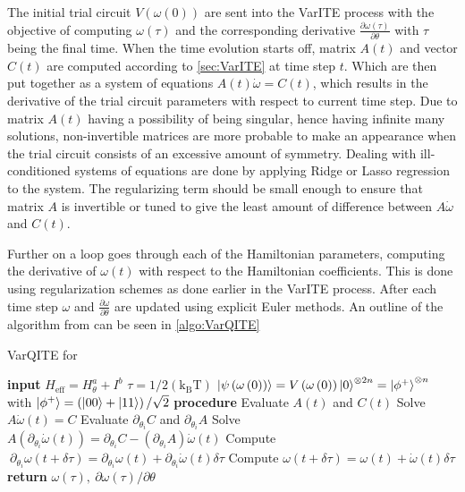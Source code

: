 \documentclass[../main.tex]{subfiles}
\begin{document}
The initial trial circuit $V(\omega(0))$ are sent into the VarITE process with the objective of computing $\omega(\tau)$ and the corresponding derivative $\frac{\partial \omega(\tau)}{\partial \theta}$ with $\tau$ being the final time. When the time evolution starts off, matrix $A(t)$ and vector $C(t)$ are computed according to \autoref{sec:VarITE} at time step $t$. Which are then put together as a system of equations $A(t)\dot{\omega}=C(t)$, which results in the derivative of the trial circuit parameters with respect to current time step. Due to matrix $A(t)$ having a possibility of being singular, hence having infinite many solutions, non-invertible matrices are more probable to make an appearance when the trial circuit consists of an excessive amount of symmetry. Dealing with ill-conditioned systems of equations are done by applying Ridge or Lasso regression to the system. The regularizing term should be small enough to ensure that matrix $A$ is invertible or tuned to give the least amount of difference between $A\dot{\omega}$ and $C(t)$.

Further on a loop goes through each of the Hamiltonian parameters, computing the derivative of $\omega(t)$ with respect to the Hamiltonian coefficients. This is done using regularization schemes as done earlier in the VarITE process. After each time step $\omega$ and $\frac{\partial\omega}{\partial \theta}$ are updated using explicit Euler methods. An outline of the algorithm from \cite{VQB:litteraturelist} can be seen in \autoref{algo:VarQITE}

\begin{algorithm}[ht]
 \caption{VarQITE for \varqbm} \label{algo:VarQITE}
\begin{algorithmic}[0]
    \State  \textbf{input}
    \State $H_{\text{eff}} = H_{\theta}^a + I^b$
	\State$\tau = {1}/{2\left(\text{k}_{\text{B}}\text{T}\right)}$
	\State $\ket{\psi\left( \omega\left(0\right)\right)} = V\left(\omega\left(0\right)\right)\ket{0}^{\otimes 2n} = \ket{\phi^{+}}^{\otimes n}$
	\State with $\ket{\phi^{+}} = \left(\ket{00}+\ket{11}\right)/{\sqrt{2}}$
    \State \textbf{procedure}
		\State Evaluate $A\left(t\right)$ and $C\left(t\right)$
		\State Solve $A\dot{\omega}\left(t\right) = C$
    			\State Evaluate $\partial_{\theta_i}C$ and $\partial_{\theta_i}A$
    			\State \label{item:linEqDer}Solve $A\left(\partial_{\theta_i}\dot{\omega}\left(t\right)\right)  = \partial_{\theta_i}C - \left(\partial_{\theta_i}A\right)\dot{\omega}\left(t\right)$
    			\State \label{item:grad_omega_tau}Compute $ \: \partial_{\theta_i}{\omega}\left(t+\delta\tau\right) = \partial_{\theta_i}{\omega}\left(t\right)+\partial_{\theta_i}\dot{\omega}\left(t\right)\delta\tau$
	   \EndFor
		\State \label{item:computeUpdateDer}Compute $\omega\left(t+\delta\tau\right) = \omega\left(t\right) +   \dot{\omega}\left(t\right)\delta\tau $
	\EndFor
	\State \textbf{return} $\omega\left(\tau\right), \: \partial\omega\left(\tau\right)/\partial\theta$
\end{algorithmic}
\end{algorithm}
\end{document}
